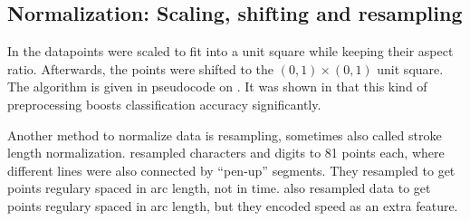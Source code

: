 \subsection{Normalization: Scaling, shifting and resampling}
In \cite{Kirsch} the datapoints were scaled to fit into a unit square while
keeping their aspect ratio. Afterwards, the points were shifted to
the $(0, 1) \times (0, 1)$ unit square. The algorithm is given in pseudocode on
. It was shown in \cite{Kirsch,Huang09} that
this kind of preprocessing boosts classification accuracy significantly.

Another method to normalize data is resampling, sometimes also called
stroke length normalization.
\cite{Guyon91} resampled characters and digits to 81 points each, where different
lines were also connected by \enquote{pen-up} segments. They resampled to get
points regulary spaced in arc length, not in time. \cite{ICASSP-94} also
resampled data to get points regulary spaced in arc length, but they encoded
speed as an extra feature.

